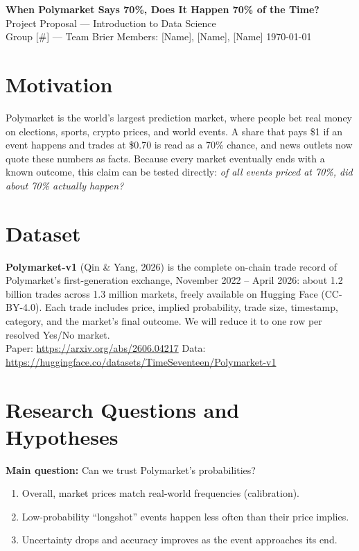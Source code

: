 \documentclass[10pt]{article}
\begin{document}
\begin{center}
  {\Large\bfseries When Polymarket Says 70\%, Does It Happen 70\% of the Time?}\\[4pt]
  {\large Project Proposal --- Introduction to Data Science}\\[6pt]
  Group [\#] --- Team Brier \quad\textbar\quad Members: [Name], [Name], [Name] \quad\textbar\quad \today
\end{center}

\section{Motivation}
Polymarket is the world's largest prediction market, where people bet real money on elections,
sports, crypto prices, and world events. A share that pays \$1 if an event happens and trades at
\$0.70 is read as a 70\% chance, and news outlets now quote these numbers as facts. Because every
market eventually ends with a known outcome, this claim can be tested directly: \emph{of all events
priced at 70\%, did about 70\% actually happen?}

\section{Dataset}
\textbf{Polymarket-v1} (Qin \& Yang, 2026) is the complete on-chain trade record of Polymarket's
first-generation exchange, November 2022 -- April 2026: about 1.2 billion trades across 1.3 million
markets, freely available on Hugging Face (CC-BY-4.0). Each trade includes price, implied probability,
trade size, timestamp, category, and the market's final outcome. We will reduce it to one row per
resolved Yes/No market.\\
{\small Paper: \url{https://arxiv.org/abs/2606.04217} \quad Data: \url{https://huggingface.co/datasets/TimeSeventeen/Polymarket-v1}}

\section{Research Questions and Hypotheses}
\textbf{Main question:} Can we trust Polymarket's probabilities?
\begin{enumerate}[leftmargin=2.2em]
  \item[\textbf{H1}] Overall, market prices match real-world frequencies (calibration).
  \item[\textbf{H2}] Low-probability ``longshot'' events happen less often than their price implies.
  \item[\textbf{H3}] Uncertainty drops and accuracy improves as the event approaches its end.
\end{enumerate}
\end{document}
